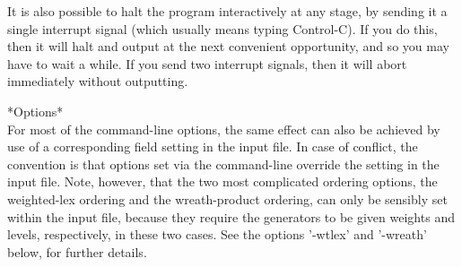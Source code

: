It is also possible to halt the program interactively at any stage, by
sending it a single interrupt signal (which usually means typing Control-C).
If you do this, then it will halt and output at the next convenient
opportunity, and so you may have to wait a while. If you send two interrupt
signals, then it will abort immediately without outputting.

*Options*\\
For most of the command-line options, the same effect can also be achieved by 
use of a corresponding field setting in the input file. In case of conflict,
the convention is that options set via the command-line override the setting in
the input file. Note, however,  that the two most complicated ordering options,
the weighted-lex ordering and the wreath-product ordering, can only
be sensibly set within the input file, because they require the generators
to be given weights and levels, respectively, in these two cases.
See the options '-wtlex' and '-wreath' below, for further details.
